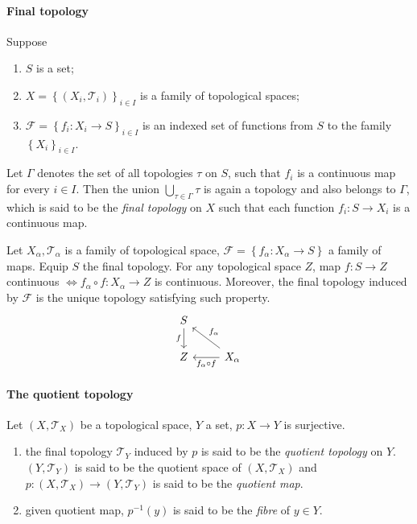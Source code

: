 \paragraph{Final topology}

\begin{definition}
  Suppose
  \begin{enumerate}
    \item \( S \) is a set;
    \item \( X = \left\lbrace (X_i, \mathcal{T}_i) \right\rbrace_{i \in I} \) is a family of topological spaces;
    \item \( \mathcal{F} = \left\lbrace f_i: X_i \to S \right\rbrace_{i \in I} \) is an indexed set of functions from \( S \) to the family \( \left\lbrace X_i \right\rbrace_{i \in I} \).
  \end{enumerate}
  Let \( \Gamma \) denotes the set of all topologies \( \mathcal{\tau} \) on \( S \), such that \( f_i \) is a continuous map for every \( i \in I \).
  Then the union \( \bigcup_{\tau \in \Gamma} \tau \) is again a topology and also belongs to \( \Gamma \), which is said to be the \emph{final topology} on \( X \) such that each function \( f_i: S \to X_i \) is a continuous map.
\end{definition}

\begin{theorem}
  Let \( X_\alpha, \mathcal{T}_\alpha \) is a family of topological space, \( \mathcal{F} = \left\lbrace f_\alpha: X_\alpha \to S \right\rbrace \) a family of maps.
  Equip \( S \) the final topology.
  For any topological space \( Z \), map \( f: S \to Z \) continuous \( \iff f_\alpha \circ f: X_\alpha \to Z \) is continuous.
  Moreover, the final topology induced by \( \mathcal{F} \) is the unique topology satisfying such property.
  \[\begin{tikzcd}
    S \\
    Z & {X_\alpha}
    \arrow["f"', from=1-1, to=2-1]
    \arrow["{{f_\alpha}}"', from=2-2, to=1-1]
    \arrow["{{f_\alpha \circ f}}", from=2-2, to=2-1]
  \end{tikzcd}\]
\end{theorem}

\paragraph{The quotient topology}

\begin{definition}
  Let \( (X, \mathcal{T}_X) \) be a topological space, \( Y \) a set, \( p: X \to Y \) is surjective.
  \begin{enumerate}
    \item the final topology \( \mathcal{T}_Y \) induced by \( p \) is said to be the \emph{quotient topology} on \( Y \).
    \( (Y, \mathcal{T}_Y) \) is said to be the quotient space of \( (X, \mathcal{T}_X) \) and \( p:(X, \mathcal{T}_X) \to (Y, \mathcal{T}_Y) \) is said to be the \emph{quotient map}.
    \item given quotient map, \( p^{-1}(y) \) is said to be the \emph{fibre} of \( y \in Y \).
  \end{enumerate}
\end{definition}

